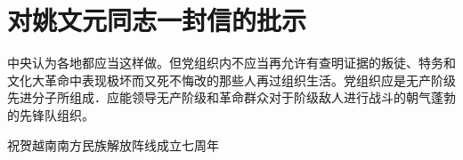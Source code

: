 \section[对姚文元同志一封信的批示（一九六七年十二月）]{对姚文元同志一封信的批示}


中央认为各地都应当这样做。但党组织内不应当再允许有查明证据的叛徒、特务和文化大革命中表现极坏而又死不悔改的那些人再过组织生活。党组织应是无产阶级先进分子所组成．应能领导无产阶级和革命群众对于阶级敌人进行战斗的朝气蓬勃的先锋队组织。

祝贺越南南方民族解放阵线成立七周年



